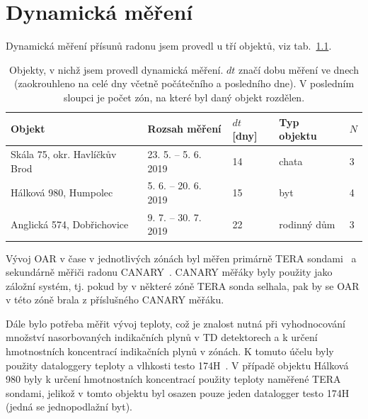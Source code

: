 \chapter{Dynamická měření}\label{navesti:dynamickaMereni}
Dynamická měření přísunů radonu jsem provedl u tří objektů, viz tab.~\ref{tab:dynMer_prehled}.
\begin{table}[ht]
	\centering
	\caption{Objekty, v nichž jsem provedl dynamická měření. $dt$ značí dobu měření ve dnech (zaokrouhleno na celé dny včetně počátečního a posledního dne). V posledním sloupci je počet zón, na které byl daný objekt rozdělen.}
	\label{tab:dynMer_prehled}
	\begin{tabular}{lllll}
		\toprule
		Objekt & Rozsah měření & $dt$ [dny] & Typ objektu &$N$\\
		\midrule
		Skála 75, okr. Havlíčkův Brod & 23. 5. -- 5. 6. 2019 & 14 & chata & 3\\
		Hálková 980, Humpolec & 5. 6. -- 20. 6. 2019 & 15 & byt & 4\\
		Anglická 574, Dobřichovice & 9. 7. -- 30. 7. 2019 & 22 & rodinný dům & 3\\
		\bottomrule
	\end{tabular}
\end{table}

Vývoj OAR v čase v jednotlivých zónách byl měřen primárně TERA sondami~\cite{tera} a sekundárně měřiči radonu CANARY~\cite{canary}. CANARY měřáky byly použity jako záložní systém, tj. pokud by v některé zóně  TERA sonda selhala, pak by se OAR v této zóně brala z příslušného CANARY měřáku. %

Dále bylo potřeba měřit vývoj teploty, což je znalost nutná při vyhodnocování množství nasorbovaných indikačních plynů v TD detektorech a k určení hmotnostních koncentrací indikačních plynů  v zónách. K tomuto účelu byly použity dataloggery teploty a vlhkosti testo 174H~\cite{testo}. V případě objektu Hálková 980 byly k určení hmotnostních koncentrací použity teploty naměřené TERA sondami, jelikož v tomto objektu byl osazen pouze jeden datalogger testo 174H (jedná se jednopodlažní byt).

